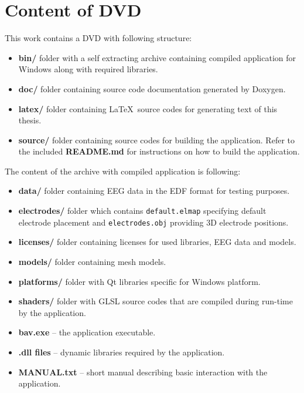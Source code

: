 \chapter{Content of DVD}
This work contains a DVD with following structure:
\begin{itemize}
	\item \textbf{bin/} folder with a self extracting archive containing compiled application for Windows along with required libraries.
	\item \textbf{doc/} folder containing source code documentation generated by Doxygen. 
	\item \textbf{latex/} folder containing \LaTeX\ source codes for generating text of this thesis.
	\item \textbf{source/} folder containing source codes for building the application. Refer to the included \textbf{README.md} for instructions on how to build the application.
\end{itemize}
The content of the archive with compiled application is following:
\begin{itemize}
	\item \textbf{data/} folder containing EEG data in the EDF format for testing purposes.
	\item \textbf{electrodes/} folder which contains \texttt{default.elmap} specifying default electrode placement and \texttt{electrodes.obj} providing 3D electrode positions. 
	\item \textbf{licenses/} folder containing licenses for used libraries, EEG data and models.
	\item \textbf{models/} folder containing mesh models.
	\item \textbf{platforms/} folder with Qt libraries specific for Windows platform.
	\item \textbf{shaders/} folder with GLSL source codes that are compiled during run-time by the application.
	\item \textbf{bav.exe} -- the application executable.
	\item \textbf{.dll files} -- dynamic libraries required by the application.
	\item \textbf{MANUAL.txt} -- short manual describing basic interaction with the application.
\end{itemize}

